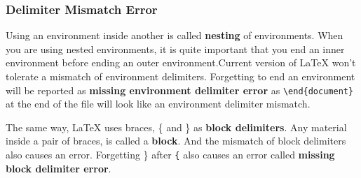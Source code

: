 \documentclass{article}
\begin{document}
\subsubsection{Delimiter Mismatch Error}
Using an environment inside another is called \textbf{nesting} of environments. When you are using nested environments, it is quite important that you end an inner environment before ending an outer environment.Current version of \LaTeX{} won't tolerate a mismatch of environment delimiters. Forgetting to end an environment will be reported as \textbf{missing environment delimiter error} as \texttt{\textbackslash end\{document\}} at the end of the file will look like an environment delimiter mismatch.

The same way, \LaTeX{} uses braces, \{ and \} as \textbf{block delimiters}. Any material inside a pair of braces, is called a \textbf{block}. And the mismatch of block delimiters also causes an error. Forgetting \} after \texttt{\{} also causes an error called \textbf{missing block delimiter error}.
\end{document}
